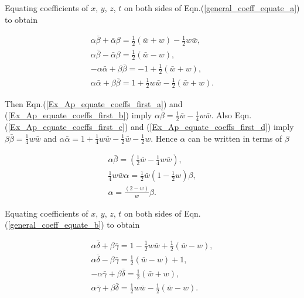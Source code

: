 \begin{appendix}
\noindent Equating coefficients of $x$, $y$, $z$, $t$ on both sides of Eqn.(\ref{general_coeff_equate_a}) to obtain

\begin{subequations}
\begin{gather}
\label{Ex_Ap_equate_coeffs_first_a}
\alpha \bar{\beta} + \bar{\alpha} \beta = \frac{1}{2}(\bar{w}+w) - \frac{1}{2}w\bar{w}, 
\\\label{Ex_Ap_equate_coeffs_first_b}
\alpha \bar{\beta} - \bar{\alpha} \beta = \frac{1}{2} (\bar{w} - w), 
\\\label{Ex_Ap_equate_coeffs_first_c}
-\alpha \bar{\alpha} + \beta \bar{\beta} = - 1 + \frac{1}{2}(\bar{w} + w), 
\\\label{Ex_Ap_equate_coeffs_first_d}
\alpha \bar{\alpha} + \beta \bar{\beta} = 1 + \frac{1}{2}w\bar{w} - \frac{1}{2}(\bar{w} + w). 
\end{gather}
\end{subequations}

\noindent Then Eqn.(\ref{Ex_Ap_equate_coeffs_first_a}) and (\ref{Ex_Ap_equate_coeffs_first_b}) imply $\alpha \bar{\beta} = \frac{1}{2}\bar{w} - \frac{1}{4}w\bar{w}$. Also Eqn.(\ref{Ex_Ap_equate_coeffs_first_c}) and (\ref{Ex_Ap_equate_coeffs_first_d}) imply $\beta\bar{\beta} = \frac{1}{4}w\bar{w}$ and $\alpha \bar{\alpha} = 1 + \frac{1}{4}w\bar{w} - \frac{1}{2}\bar{w} - \frac{1}{2}w$. Hence $\alpha$ can be written in terms of $\beta$

\begin{gather*}
\alpha \bar{\beta} = (\frac{1}{2}\bar{w} - \frac{1}{4}w\bar{w}), \\
\frac{1}{4} w \bar{w} \alpha = \frac{1}{2}\bar{w}(1-\frac{1}{2}w)\beta, \\
\alpha = \frac{(2-w)}{w}\beta.
\end{gather*}

Equating coefficients of $x$, $y$, $z$, $t$ on both sides of Eqn.(\ref{general_coeff_equate_b}) to obtain

\begin{subequations}
\begin{gather}\label{Ex_Ap_equate_coeffs_second_a}
\alpha \bar{\delta} + \beta\bar{\gamma} = 1 - \frac{1}{2}w\bar{w} + \frac{1}{2}(\bar{w}-w), \\\label{Ex_Ap_equate_coeffs_second_b}
\alpha \bar{\delta} - \beta\bar{\gamma} = \frac{1}{2}(\bar{w}-w) + 1,\\\label{Ex_Ap_equate_coeffs_second_c}
-\alpha\bar{\gamma} + \beta \bar{\delta} = \frac{1}{2}(\bar{w} + w) ,\\\label{Ex_Ap_equate_coeffs_second_d}
\alpha\bar{\gamma} + \beta \bar{\delta} = \frac{1}{2}w\bar{w} - \frac{1}{2}(\bar{w}-w). 
\end{gather}
\end{subequations}


\end{appendix}

